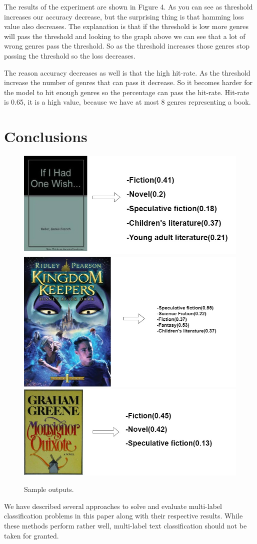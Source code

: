 \documentclass[10pt,twocolumn,letterpaper]{article}
\begin{document}
The results of the experiment are shown in Figure 4. As you can see as threshold increases our accuracy decrease, but the surprising thing is that hamming loss value also decreases. The explanation is that if the threshold is low more genres will pass the threshold and looking to the graph above we can see that a lot of wrong genres pass the threshold. So as the threshold increases those genres stop passing the threshold so the loss decreases. 

The reason accuracy decreases as well is that the high hit-rate. As the threshold increase the number of genres that can pass it decrease. So it becomes harder for the model to hit enough genres so the percentage can pass the hit-rate. Hit-rate is 0.65, it is a high value, because we have at most 8 genres representing a book. 

\section{Conclusions}
\begin{figure}
\begin{minipage}{1\linewidth}

\includegraphics[width=0.3\linewidth]{book1}
\includegraphics[width=0.4\linewidth]{book2}
\includegraphics[width=0.3\linewidth]{book3}

\caption{Sample outputs.}

\end{minipage}
\label{fig:short}
\end{figure}

We have described several approaches to solve and evaluate multi-label classification problems in this paper along with their respective results. While these methods perform rather well, multi-label text classification should not be taken for granted. 
\end{document}
